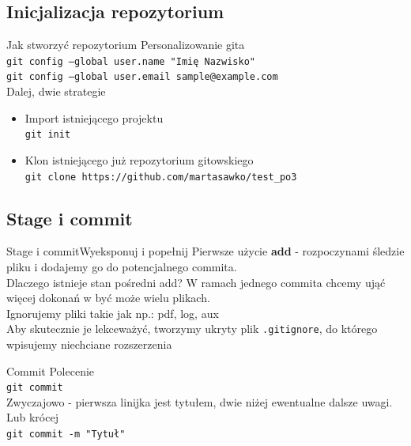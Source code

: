\documentclass{beamer}
\begin{document}
\subsection{Inicjalizacja repozytorium}
\begin{frame}{Jak stworzyć repozytorium}
  Personalizowanie gita \\
  \texttt{git config --global user.name "Imię Nazwisko" \\
 git config --global user.email sample@example.com} \\
 \vspace{3mm}
 Dalej, dwie strategie
 \begin{itemize}
  \item Import istniejącego projektu \\
  \texttt{git init}
  \item Klon istniejącego już repozytorium gitowskiego \\
  \texttt{git clone https://github.com/martasawko/test\_po3}
 \end{itemize}
\end{frame}

\subsection{Stage i commit}
\begin{frame}{Stage i commit}{Wyeksponuj i popełnij}
 Pierwsze użycie \textbf{add} - rozpoczynami śledzie pliku i dodajemy go do potencjalnego commita. \\
 Dlaczego istnieje stan pośredni add? W ramach jednego commita chcemy ująć więcej dokonań w być może wielu plikach. \\
 \vspace{2mm}
 Ignorujemy pliki takie jak np.: pdf, log, aux \\
 Aby skutecznie je lekceważyć, tworzymy ukryty plik \texttt{.gitignore}, do którego wpisujemy niechciane rozszerzenia 
\end{frame}

\begin{frame}{Commit}
  Polecenie \\
 \texttt{git commit} \\
 Zwyczajowo - pierwsza linijka jest tytułem, dwie niżej ewentualne dalsze uwagi. \\
 Lub krócej\\
 \texttt{git commit -m "Tytuł"}
\end{frame}
\end{document}
